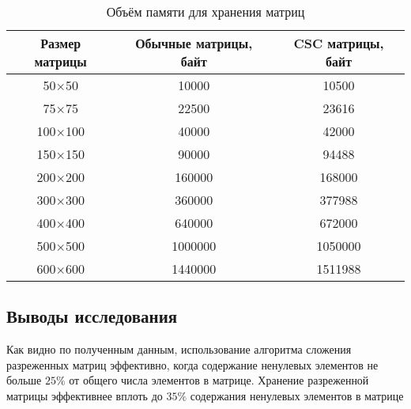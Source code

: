 \begin{table}[H]
	\centering
	\caption{Объём памяти для хранения матриц}
	\begin{tabular}{|c|c|c|}
		\hline
		Размер матрицы & Обычные матрицы, байт & CSC матрицы, байт \\ \hline
		50$\times$50         & 10000                 & 10500             \\ \hline
		75$\times$75         & 22500                 & 23616             \\ \hline
		100$\times$100        & 40000                 & 42000	             \\ \hline
		150$\times$150        & 90000                 & 94488            \\ \hline
		200$\times$200        & 160000                & 168000            \\ \hline
		300$\times$300        & 360000                & 377988            \\ \hline
		400$\times$400        & 640000                & 672000           \\ \hline
		500$\times$500        & 1000000               & 1050000           \\ \hline
		600$\times$600        & 1440000               & 1511988           \\ \hline
	\end{tabular}
\end{table}

\subsection{Выводы исследования}
Как видно по полученным данным, использование алгоритма сложения разреженных матриц эффективно, когда содержание ненулевых элементов не больше $25\%$ от общего числа элементов в матрице. 
Хранение разреженной матрицы эффективнее вплоть до $35\%$ содержания ненулевых элементов в матрице
